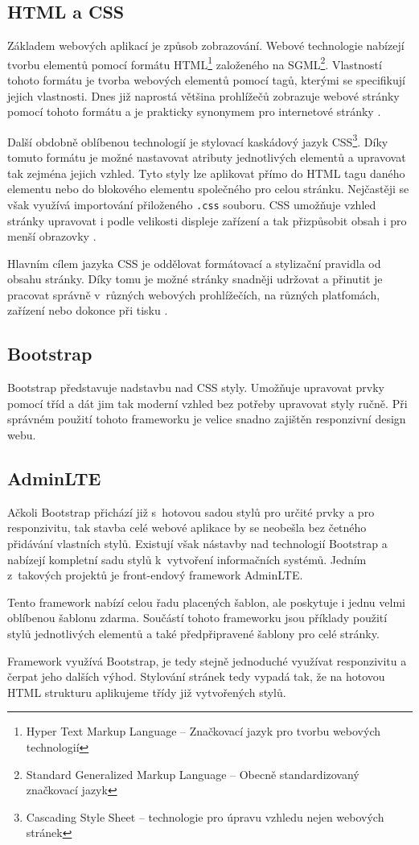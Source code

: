 \documentclass[czech,BP]{thesiskiv}
\begin{document}
	\subsection{HTML a CSS}
		\par Základem webových aplikací je způsob zobrazování. Webové technologie nabízejí tvorbu elementů pomocí formátu HTML\footnote{Hyper Text Markup Language -- Značkovací jazyk pro tvorbu webových technologií} založeného na SGML\footnote{Standard Generalized Markup Language -- Obecně standardizovaný značkovací jazyk}. Vlastností tohoto formátu je tvorba webových elementů pomocí tagů, kterými se specifikují jejich vlastnosti. Dnes již naprostá většina prohlížečů zobrazuje webové stránky pomocí tohoto formátu a je prakticky synonymem pro internetové stránky \cite{HTML5aCSS3}.
		\par Další obdobně oblíbenou technologií je stylovací kaskádový jazyk CSS\footnote{Cascading Style Sheet -- technologie pro úpravu vzhledu nejen webových stránek}. Díky tomuto formátu je možné nastavovat atributy jednotlivých elementů a upravovat tak zejména jejich vzhled. Tyto styly lze aplikovat přímo do HTML tagu daného elementu nebo do blokového elementu společného pro celou stránku. Nejčastěji se však využívá importování přiloženého \texttt{.css} souboru. CSS umožňuje vzhled stránky upravovat i podle velikosti displeje zařízení a tak přizpůsobit obsah i pro menší obrazovky \cite{CSSOkamzite}.
		\par Hlavním cílem jazyka CSS je oddělovat formátovací a stylizační pravidla od obsahu stránky. Díky tomu je možné stránky snadněji udržovat a přinutit je pracovat správně v~různých webových prohlížečích, na různých platfomách, zařízení nebo dokonce při tisku \cite{HTML5aCSS3}.
	\subsection{Bootstrap}
		\par Bootstrap představuje nadstavbu nad CSS styly. Umožňuje upravovat prvky pomocí tříd a dát jim tak moderní vzhled bez potřeby upravovat styly ručně. Při správném použití tohoto frameworku je velice snadno zajištěn responzivní design webu.
	\subsection{AdminLTE}
		Ačkoli Bootstrap přichází již s~hotovou sadou stylů pro určité prvky a pro responzivitu, tak stavba celé webové aplikace by se neobešla bez četného přidávání vlastních stylů. Existují však nástavby nad technologií Bootstrap a nabízejí kompletní sadu stylů k~vytvoření informačních systémů. Jedním z~takových projektů je front-endový framework AdminLTE. 
		\par Tento framework nabízí celou řadu placených šablon, ale poskytuje i jednu velmi oblíbenou šablonu zdarma. Součástí tohoto frameworku jsou příklady použití stylů jednotlivých elementů a také předpřipravené šablony pro celé stránky.
		\par Framework využívá Bootstrap, je tedy stejně jednoduché využívat responzivitu a čerpat jeho dalších výhod. Stylování stránek tedy vypadá tak, že na hotovou HTML strukturu aplikujeme třídy již vytvořených stylů.
\end{document}
